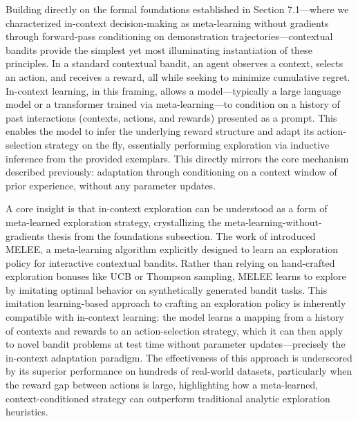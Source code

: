 \documentclass[11pt]{article}
\begin{document}
Building directly on the formal foundations established in Section 7.1---where we characterized in-context decision-making as meta-learning without gradients through forward-pass conditioning on demonstration trajectories---contextual bandits provide the simplest yet most illuminating instantiation of these principles. In a standard contextual bandit, an agent observes a context, selects an action, and receives a reward, all while seeking to minimize cumulative regret. In-context learning, in this framing, allows a model---typically a large language model or a transformer trained via meta-learning---to condition on a history of past interactions (contexts, actions, and rewards) presented as a prompt. This enables the model to infer the underlying reward structure and adapt its action-selection strategy on the fly, essentially performing exploration via inductive inference from the provided exemplars. This directly mirrors the core mechanism described previously: adaptation through conditioning on a context window of prior experience, without any parameter updates.

A core insight is that in-context exploration can be understood as a form of meta-learned exploration strategy, crystallizing the meta-learning-without-gradients thesis from the foundations subsection. The work of \cite{ref313} introduced MELEE, a meta-learning algorithm explicitly designed to learn an exploration policy for interactive contextual bandits. Rather than relying on hand-crafted exploration bonuses like UCB or Thompson sampling, MELEE learns to explore by imitating optimal behavior on synthetically generated bandit tasks. This imitation learning-based approach to crafting an exploration policy is inherently compatible with in-context learning: the model learns a mapping from a history of contexts and rewards to an action-selection strategy, which it can then apply to novel bandit problems at test time without parameter updates---precisely the in-context adaptation paradigm. The effectiveness of this approach is underscored by its superior performance on hundreds of real-world datasets, particularly when the reward gap between actions is large, highlighting how a meta-learned, context-conditioned strategy can outperform traditional analytic exploration heuristics.
\end{document}
